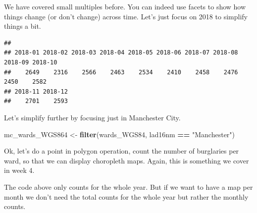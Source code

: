 \documentclass[]{book}
\newenvironment{Shaded}{\begin{snugshade}}{\end{snugshade}}
\newcommand{\CommentTok}[1]{\textcolor[rgb]{0.56,0.35,0.01}{\textit{#1}}}
\newcommand{\DataTypeTok}[1]{\textcolor[rgb]{0.13,0.29,0.53}{#1}}
\newcommand{\DecValTok}[1]{\textcolor[rgb]{0.00,0.00,0.81}{#1}}
\newcommand{\KeywordTok}[1]{\textcolor[rgb]{0.13,0.29,0.53}{\textbf{#1}}}
\newcommand{\NormalTok}[1]{#1}
\newcommand{\OperatorTok}[1]{\textcolor[rgb]{0.81,0.36,0.00}{\textbf{#1}}}
\newcommand{\OtherTok}[1]{\textcolor[rgb]{0.56,0.35,0.01}{#1}}
\newcommand{\StringTok}[1]{\textcolor[rgb]{0.31,0.60,0.02}{#1}}
\begin{document}
We have covered small multiples before. You can indeed use facets to show how things change (or don't change) across time. Let's just focus on 2018 to simplify things a bit.

\begin{Shaded}
\end{Shaded}

\begin{verbatim}
## 
## 2018-01 2018-02 2018-03 2018-04 2018-05 2018-06 2018-07 2018-08 2018-09 2018-10 
##    2649    2316    2566    2463    2534    2410    2458    2476    2450    2582 
## 2018-11 2018-12 
##    2701    2593
\end{verbatim}

Let's simplify further by focusing just in Manchester City.

\begin{Shaded}
\begin{Highlighting}[]
\NormalTok{mc_wards_WGS864 <-}\StringTok{ }\KeywordTok{filter}\NormalTok{(wards_WGS84, lad16nm }\OperatorTok{==}\StringTok{ "Manchester"}\NormalTok{)}
\end{Highlighting}
\end{Shaded}

Ok, let's do a point in polygon operation, count the number of burglaries per ward, so that we can display choropleth maps. Again, this is something we cover in week 4.

\begin{Shaded}
\end{Shaded}

The code above only counts for the whole year. But if we want to have a map per month we don't need the total counts for the whole year but rather the monthly counts.
\end{document}
